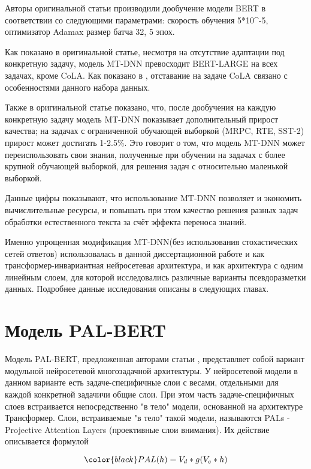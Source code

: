 \begin{itemize}
Авторы оригинальной статьи производили дообучение модели BERT в соответствии со следующими параметрами: скорость обучения 5*10^{-5}, оптимизатор Adamax \cite{Kingma_Ba_2014} размер батча 32, 5 эпох. 

Как показано в оригинальной статье, несмотря на отсутствие адаптации под конкретную задачу, модель MT-DNN превосходит BERT-LARGE на всех задачах, кроме CoLA. Как показано в \cite{Коновалов_2022}, отставание на задаче CoLA связано с особенностями данного набора данных. 

Также в оригинальной статье показано, что, после дообучения на каждую конкретную задачу модель MT-DNN показывает дополнительный прирост качества; на задачах с ограниченной обучающей выборкой (MRPC, RTE, SST-2) прирост может достигать 1-2.5\%. Это говорит о том, что модель MT-DNN может переиспользовать свои знания, полученные при обучении на задачах  с более крупной обучающей выборкой, для решения задач с относительно маленькой выборкой.

Данные цифры показывают, что использование MT-DNN позволяет и экономить вычислительные ресурсы, и повышать при этом качество решения разных задач обработки естественного текста за счёт эффекта переноса знаний. 

Именно упрощенная модификация MT-DNN(без использования стохастических сетей ответов) использовалась в данной диссертационной работе и как трансформер-инвариантная нейросетевая архитектура, и как архитектура с одним линейным слоем, для которой исследовались различные варианты псевдоразметки данных. Подробнее данные исследования описаны в следующих главах. 

\section{Модель PAL-BERT}
Модель PAL-BERT, предложенная авторами статьи \cite{Stickland_Murray_2019}, представляет собой вариант модульной нейросетевой многозадачной архитектуры. У нейросетевой модели в данном варианте есть задаче-специфичные слои с весами, отдельными для каждой конкретной задачичи общие слои. При этом часть задаче-специфичных слоев встраивается непосредственно "в тело" модели, основанной на архитектуре Трансформер. 
Слои, встраиваемые "в тело" такой модели, называются PALs - Projective Attention Layers (проективные слои внимания). Их действие описывается формулой 

\begin{equation}
\color{black}PAL(h) = V_{d}*g(V_{e}*h) \label{eq:ref}
\end{equation}


\end{itemize}
